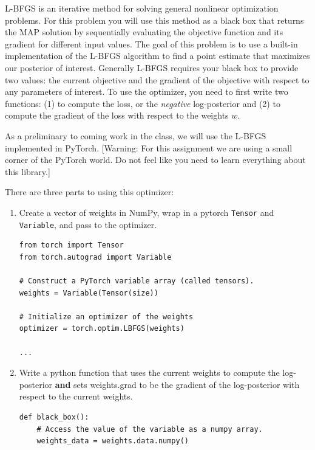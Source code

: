 \documentclass[submit]{harvardml}
\begin{document}
\begin{problem}[14pts]\label{prob:numerical_linear_model}
  L-BFGS is an iterative method for solving general nonlinear
  optimization problems. For this problem you will use this method as
  a black box that returns the MAP solution by sequentially evaluating
  the objective function and its gradient for different input
  values. The goal of this problem is to use a built-in implementation
  of the L-BFGS algorithm to find a point estimate that maximizes our
  posterior of interest. Generally L-BFGS requires your black box to
  provide two values: the current objective and the gradient of the
  objective with respect to any parameters of interest. To use the optimizer, you need to
first write two functions: (1) to compute the loss, or the
\textit{negative} log-posterior and (2) to compute the gradient of the
loss with respect to the weights $w$.

\smallskip

As a preliminary to coming work in the class, we will use the L-BFGS
implemented in PyTorch. [Warning: For this assignment we are using a
small corner of the PyTorch world. Do not feel like you need to learn
everything about this library.]

There are three parts to using this optimizer:

\begin{enumerate}
\item  Create a vector of weights in NumPy,  wrap in a pytorch \texttt{Tensor} and  \texttt{Variable},
and pass to the optimizer.
\begin{verbatim}
from torch import Tensor
from torch.autograd import Variable

# Construct a PyTorch variable array (called tensors).
weights = Variable(Tensor(size))

# Initialize an optimizer of the weights
optimizer = torch.optim.LBFGS(weights)

...
\end{verbatim}

\item Write a python function that uses the
current weights  to compute the log-posterior
\textbf{and} sets weights.grad to be the gradient of the log-posterior
with respect to the current weights.



\begin{verbatim}
def black_box():
    # Access the value of the variable as a numpy array.
    weights_data = weights.data.numpy()


\end{verbatim}
\end{enumerate}
\end{problem}
\end{document}
